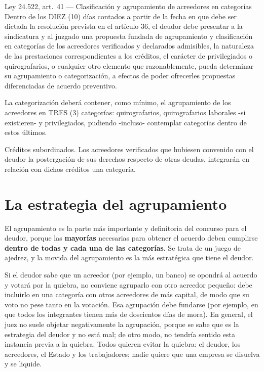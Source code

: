 \documentclass[12pt,oneside]{book}
\begin{document}
\begin{norma}{Ley 24.522, art.\ 41 --- Clasificación y agrupamiento de acreedores en categorías}
Dentro de los DIEZ (10) días contados a partir de la fecha en que debe ser dictada la resolución prevista en el artículo 36, el deudor debe presentar a la sindicatura y al juzgado una propuesta fundada de agrupamiento y clasificación en categorías de los acreedores verificados y declarados admisibles, la naturaleza de las prestaciones correspondientes a los créditos, el carácter de privilegiados o quirografarios, o cualquier otro elemento que razonablemente, pueda determinar su agrupamiento o categorización, a efectos de poder ofrecerles propuestas diferenciadas de acuerdo preventivo.

La categorización deberá contener, como mínimo, el agrupamiento de los acreedores en TRES (3) categorías: quirografarios, quirografarios laborales -si existieren- y privilegiados, pudiendo -incluso- contemplar categorías dentro de estos últimos.

Créditos subordinados. Los acreedores verificados que hubiesen convenido con el deudor la postergación de sus derechos respecto de otras deudas, integrarán en relación con dichos créditos una categoría.
\end{norma}

\section{La estrategia del agrupamiento}

El agrupamiento es la parte más importante y definitoria del concurso para el deudor, porque las \textbf{mayorías} necesarias para obtener el acuerdo deben cumplirse \textbf{dentro de todas y cada una de las categorías}. Se trata de un juego de ajedrez, y la movida del agrupamiento es la más estratégica que tiene el deudor.

Si el deudor sabe que un acreedor (por ejemplo, un banco) se opondrá al acuerdo y votará por la quiebra, no conviene agruparlo con otro acreedor pequeño: debe incluirlo en una categoría con otros acreedores de más capital, de modo que su voto no pese tanto en la votación. Esa agrupación debe fundarse (por ejemplo, en que todos los integrantes tienen más de doscientos días de mora). En general, el juez no suele objetar negativamente la agrupación, porque se sabe que es la estrategia del deudor y no está mal; de otro modo, no tendría sentido esta instancia previa a la quiebra. Todos quieren evitar la quiebra: el deudor, los acreedores, el Estado y los trabajadores; nadie quiere que una empresa se disuelva y se liquide.
\end{document}
